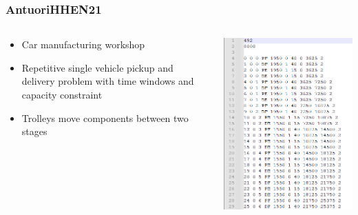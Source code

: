 \documentclass[dvipsnames,aspectratio=169]{beamer}
\begin{document}
\begin{frame}
\frametitle{AntuoriHHEN21 \cite{AntuoriHHEN21}}
\begin{columns}
\begin{column}{0.5\textwidth}
\begin{itemize}
\item Car manufacturing workshop
\item Repetitive single vehicle pickup and delivery problem with time windows and capacity constraint
\item Trolleys move components between two stages
\end{itemize}
\end{column}
\begin{column}{0.5\textwidth}
\includegraphics[width=.75\textwidth]{images/AntuoriHHEN21}
\end{column}
\end{columns}
\end{frame}
\end{document}
